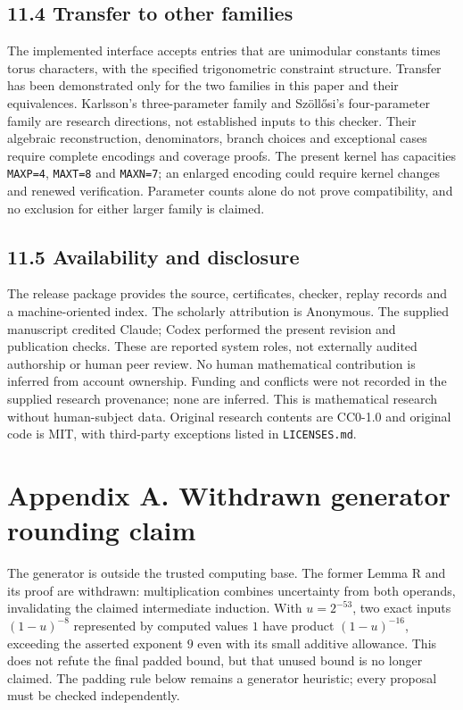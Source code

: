 \documentclass[
  11pt,
]{article}
\newcounter{none} %
\begin{document}
\subsection{11.4 Transfer to other
families}\label{transfer-to-other-families}

The implemented interface accepts entries that are unimodular constants
times torus characters, with the specified trigonometric constraint
structure. Transfer has been demonstrated only for the two families in
this paper and their equivalences. Karlsson's three-parameter family and
Szöllősi's four-parameter family are research directions, not
established inputs to this checker. Their algebraic reconstruction,
denominators, branch choices and exceptional cases require complete
encodings and coverage proofs. The present kernel has capacities
\texttt{MAXP=4}, \texttt{MAXT=8} and \texttt{MAXN=7}; an enlarged
encoding could require kernel changes and renewed verification.
Parameter counts alone do not prove compatibility, and no exclusion for
either larger family is claimed.

\subsection{11.5 Availability and
disclosure}\label{availability-and-disclosure}

The release package provides the source, certificates, checker, replay
records and a machine-oriented index. The scholarly attribution is
Anonymous. The supplied manuscript credited Claude; Codex performed the
present revision and publication checks. These are reported system
roles, not externally audited authorship or human peer review. No human
mathematical contribution is inferred from account ownership. Funding
and conflicts were not recorded in the supplied research provenance;
none are inferred. This is mathematical research without human-subject
data. Original research contents are CC0-1.0 and original code is MIT,
with third-party exceptions listed in \texttt{LICENSES.md}.

\section{Appendix A. Withdrawn generator rounding
claim}\label{appendix-a.-withdrawn-generator-rounding-claim}

The generator is outside the trusted computing base. The former Lemma R
and its proof are withdrawn: multiplication combines uncertainty from
both operands, invalidating the claimed intermediate induction. With
\(u=2^{-53}\), two exact inputs \((1-u)^{-8}\) represented by computed
values \(1\) have product \((1-u)^{-16}\), exceeding the asserted
exponent \(9\) even with its small additive allowance. This does not
refute the final padded bound, but that unused bound is no longer
claimed. The padding rule below remains a generator heuristic; every
proposal must be checked independently.
\end{document}

